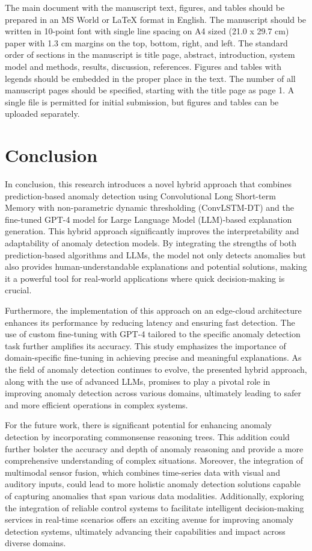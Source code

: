 \documentclass[final,3p,times,twocolumn]{elsarticle}
\begin{document}
The main document with the manuscript text, figures, and tables should be prepared in an MS World or LaTeX format in English. 
The manuscript should be written in 10-point font with single line spacing on A4 sized (21.0 x 29.7 cm) paper with 1.3 cm margins on the top, bottom, right, and left. 
The standard order of sections in the manuscript is title page, abstract, introduction, system model and methods, results, discussion, references. 
Figures and tables with legends should be embedded in the proper place in the text. 
The number of all manuscript pages should be specified, starting with the title page as page 1. A single file is permitted for initial submission, but figures and tables can be uploaded separately.

\section{Conclusion}\label{sec4}
In conclusion, this research introduces a novel hybrid approach that combines prediction-based anomaly detection using Convolutional Long Short-term Memory with non-parametric dynamic thresholding (ConvLSTM-DT) and the fine-tuned GPT-4 model for Large Language Model (LLM)-based explanation generation. This hybrid approach significantly improves the interpretability and adaptability of anomaly detection models. By integrating the strengths of both prediction-based algorithms and LLMs, the model not only detects anomalies but also provides human-understandable explanations and potential solutions, making it a powerful tool for real-world applications where quick decision-making is crucial.

Furthermore, the implementation of this approach on an edge-cloud architecture enhances its performance by reducing latency and ensuring fast detection. The use of custom fine-tuning with GPT-4 tailored to the specific anomaly detection task further amplifies its accuracy. This study emphasizes the importance of domain-specific fine-tuning in achieving precise and meaningful explanations. As the field of anomaly detection continues to evolve, the presented hybrid approach, along with the use of advanced LLMs, promises to play a pivotal role in improving anomaly detection across various domains, ultimately leading to safer and more efficient operations in complex systems.

For the future work, there is significant potential for enhancing anomaly detection by incorporating commonsense reasoning trees. This addition could further bolster the accuracy and depth of anomaly reasoning and provide a more comprehensive understanding of complex situations. Moreover, the integration of multimodal sensor fusion, which combines time-series data with visual and auditory inputs, could lead to more holistic anomaly detection solutions capable of capturing anomalies that span various data modalities. Additionally, exploring the integration of reliable control systems to facilitate intelligent decision-making services in real-time scenarios offers an exciting avenue for improving anomaly detection systems, ultimately advancing their capabilities and impact across diverse domains.
\end{document}
